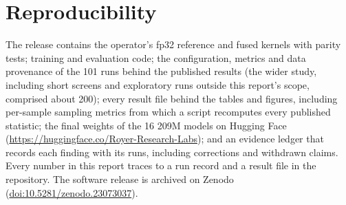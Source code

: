 \documentclass[11pt]{article}
\begin{document}
\section{Reproducibility}

The release contains the operator's fp32 reference and fused kernels with parity tests; training and
evaluation code; the configuration, metrics and data provenance of the 101 runs behind the published
results (the wider study, including short screens and exploratory runs outside this report's scope,
comprised about 200); every result file behind the tables and figures, including per-sample sampling
metrics from which a script recomputes every published statistic; the final weights of the 16 209M
models on Hugging Face (\url{https://huggingface.co/Royer-Research-Labs}); and an evidence ledger that records
each finding with its runs, including corrections and withdrawn claims. Every number in this
report traces to a run record and a result file in the repository. The software release is archived on Zenodo (\href{https://doi.org/10.5281/zenodo.23073037}{doi:10.5281/zenodo.23073037}).
\end{document}

